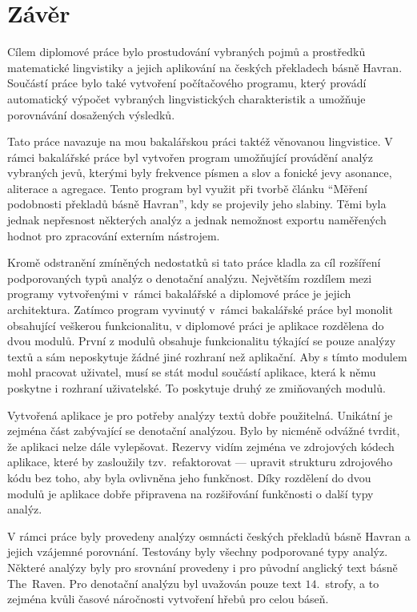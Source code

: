 \documentclass[dp.tex]{subfiles}
\begin{document}
\chapter*{Závěr}
\label{chap:zaver} 

Cílem diplomové práce bylo prostudování vybraných pojmů a prostředků matematické lingvistiky a jejich aplikování na českých překladech básně Havran. Součástí práce bylo také \mbox{vytvoření} počítačového programu, který provádí automatický výpočet vybraných lingvistických charakteristik a umožňuje porovnávání dosažených výsledků.

Tato práce navazuje na mou bakalářskou práci taktéž věnovanou lingvistice. V rámci bakalářské práce byl vytvořen program umožňující provádění analýz vybraných jevů, kterými byly frekvence písmen a slov a fonické jevy asonance, aliterace a agregace. Tento program byl využit při tvorbě článku \enquote{Měření podobnosti překladů básně Havran}, kdy se projevily jeho slabiny. Těmi byla jednak nepřesnost některých analýz a jednak nemožnost exportu naměřených hodnot pro zpracování externím nástrojem.

Kromě odstranění zmíněných nedostatků si tato práce kladla za cíl rozšíření podporovaných typů analýz o denotační analýzu. Největším rozdílem mezi programy vytvořenými v~rámci bakalářské a diplomové práce je jejich architektura. Zatímco program vyvinutý v~rámci bakalářské práce byl monolit obsahující veškerou funkcionalitu, v diplomové práci je aplikace rozdělena do dvou modulů. První z modulů obsahuje funkcionalitu týkající se pouze analýzy textů a sám neposkytuje žádné jiné rozhraní než aplikační. Aby s tímto modulem mohl pracovat uživatel, musí se stát modul součástí aplikace, která k němu poskytne i rozhraní \mbox{uživatelské}. To poskytuje druhý ze zmiňovaných modulů.

Vytvořená aplikace je pro potřeby analýzy textů dobře použitelná. Unikátní je zejména část zabývající se denotační analýzou. Bylo by nicméně odvážné tvrdit, že aplikaci nelze dále \mbox{vylepšovat}. Rezervy vidím zejména ve zdrojových kódech aplikace, které by zasloužily tzv.~refaktorovat --- upravit strukturu zdrojového kódu bez toho, aby byla ovlivněna jeho funkčnost. Díky rozdělení do dvou modulů je aplikace dobře připravena na rozšiřování funkčnosti o další typy analýz.

V rámci práce byly provedeny analýzy osmnácti českých překladů básně Havran a jejich vzájemné porovnání. Testovány byly všechny podporované typy analýz. Některé analýzy byly pro srovnání provedeny i pro původní anglický text básně The~Raven. Pro denotační analýzu byl uvažován pouze text $14.$~strofy, a to zejména kvůli časové náročnosti vytvoření hřebů pro celou báseň.
\end{document}

